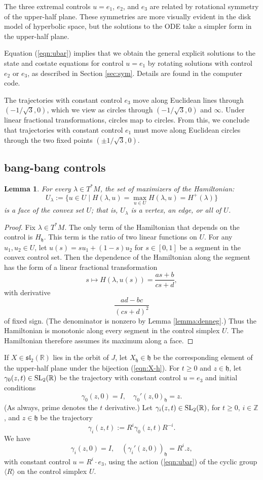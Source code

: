 \documentclass{article}
\newtheorem{lemma}[theorem]{Lemma}
\theoremstyle{remark}
\newcommand{\ring}[1]{\mathbb{#1}}
\newcommand{\op}[1]{\hbox{#1}}
\def\sl{\mathfrak{sl}_2(\ring{R})}
\def\SL{\op{SL}_2(\ring{R})}
\def\h{\mathfrak h}
\begin{document}
The three extremal controls $u=e_1$, $e_2$, and $e_3$ are related by
rotational symmetry of the upper-half plane.  These symmetries are
more visually evident in the disk model of hyperbolic space, but the
solutions to the ODE take a simpler form in the upper-half plane.


Equation (\ref{eqn:ubar}) implies that we obtain the general
explicit solutions to the state and costate equations for control
$u=e_1$ by rotating solutions with control $e_2$ or $e_3$, as
described in Section \ref{sec:sym}.  
Details are found in the
computer code.

The trajectories with constant control $e_3$ move along Euclidean
lines through $(-1/\sqrt{3},0)$, which we view as circles through
$(-1/\sqrt{3},0)$ and $\infty$.  Under linear fractional
transformations, circles map to circles.  From this, we conclude that
trajectories with constant control $e_1$ must move along Euclidean
circles through the two fixed points $(\pm 1/\sqrt{3},0)$.


\subsection{bang-bang controls}\label{sec:bang}


\begin{lemma}\label{lemma:u-lambda} 
For every $\lambda\in T^*M$, the set of maximizers of
  the Hamiltonian:
\[
U_\lambda := \{u \in U \mid H(\lambda,u) = 
\max_{u\in U} H(\lambda,u) = H^+(\lambda)\}
\]
is a face of the convex set $U$; that is, $U_\lambda$ is a vertex, an
edge, or all of $U$.
\end{lemma}

\begin{proof}
  Fix $\lambda\in T^*M$.  The only term of the Hamiltonian that
  depends on the control is $H_{\h}$.  This term is the ratio of two
  linear functions on $U$.  For any $u_1,u_2\in U$, let $u(s) = s u_1
  + (1-s) u_2$ for $s\in [0,1]$ be a segment in the convex control
  set.  Then the dependence of the Hamiltonian along the segment has
  the form of a linear fractional transformation
\[
s\mapsto H(\lambda,u(s))=\frac{a s + b}{c s + d},
\]
with derivative
\[
\frac{ad - bc}{(c s + d)^2}
\]
of fixed sign.  (The denominator is nonzero by Lemma
\ref{lemma:denneg}.)  Thus the Hamiltonian is monotonic along every
segment in the control simplex $U$.  The Hamiltonian therefore assumes
its maximum along a face.
\end{proof}


If $X\in \sl$ lies in the orbit of $J$, let $X_\h\in \h$ be the
corresponding element of the upper-half plane under the bijection
(\ref{eqn:X-h}).  For $t\ge 0$ and $z\in\h$, let $\gamma_0(z,t)\in
\SL$ be the trajectory with constant control $u=e_3$ and initial
conditions
\[
\gamma_0(z,0)=I,\quad \gamma_0'(z,0)_\h =  z.
\]
 (As always, prime denotes the
$t$ derivative.)
Let $\gamma_i(z,t)\in \SL$, for $t\ge 0$, $i\in\ring{Z}$, and $z\in
\h$ be the trajectory
\[
\gamma_i (z,t) := R^i \gamma_0(z,t) R^{-i}.
\]
We have 
\[
\gamma_i(z,0) = I,\quad 
(\gamma_i'(z,0))_\h = R^i.z,
\]
with constant control $u=R^i\cdot e_3$, using the action
(\ref{eqn:ubar}) of the cyclic group $\langle R\rangle$ on the control
simplex $U$. %
\end{document}

